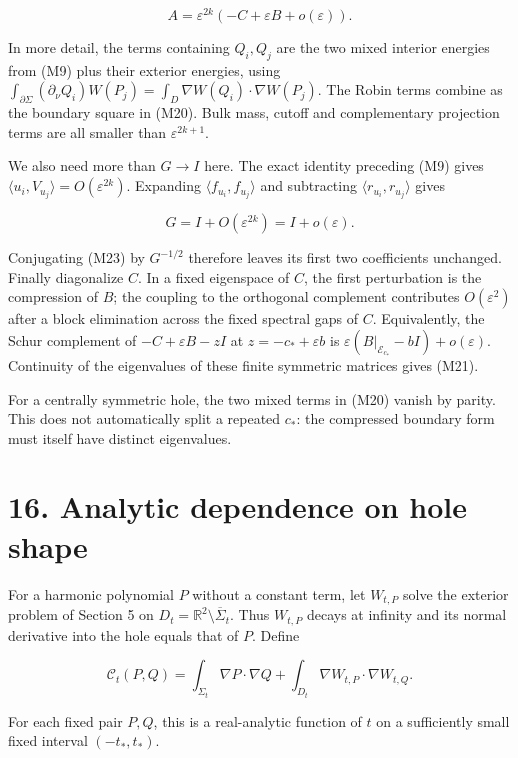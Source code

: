 \documentclass[11pt]{article}
\begin{document}
\[
 A=\varepsilon^{2k}(-C+\varepsilon B+o(\varepsilon)).
 \tag{M23}
\]

In more detail, the terms containing \(Q_i,Q_j\) are the two mixed
interior energies from (M9) plus their exterior energies, using
\(\int_{\partial\Sigma}(\partial_\nu Q_i)W(P_j)
 =\int_D\nabla W(Q_i)\cdot\nabla W(P_j)\). The Robin terms combine as
the boundary square in (M20). Bulk mass, cutoff and complementary
projection terms are all smaller than \(\varepsilon^{2k+1}\).

We also need more than \(G\to I\) here. The exact identity preceding
(M9) gives \(\langle u_i,V_{u_j}\rangle=O(\varepsilon^{2k})\). Expanding
\(\langle f_{u_i},f_{u_j}\rangle\) and subtracting
\(\langle r_{u_i},r_{u_j}\rangle\) gives

\[
 G=I+O(\varepsilon^{2k})=I+o(\varepsilon).
 \tag{M24}
\]

Conjugating (M23) by \(G^{-1/2}\) therefore leaves its first two
coefficients unchanged. Finally diagonalize \(C\). In a fixed eigenspace
of \(C\), the first perturbation is the compression of \(B\); the
coupling to the orthogonal complement contributes \(O(\varepsilon^2)\)
after a block elimination across the fixed spectral gaps of \(C\).
Equivalently, the Schur complement of \(-C+\varepsilon B-zI\) at
\(z=-c_*+\varepsilon b\) is
\(\varepsilon(B|_{\mathcal E_{c_*}}-bI)+o(\varepsilon)\). Continuity of
the eigenvalues of these finite symmetric matrices gives (M21).

For a centrally symmetric hole, the two mixed terms in (M20) vanish by
parity. This does not automatically split a repeated \(c_*\): the
compressed boundary form must itself have distinct eigenvalues.

\section{16. Analytic dependence on hole
shape}\label{analytic-dependence-on-hole-shape}

For a harmonic polynomial \(P\) without a constant term, let \(W_{t,P}\)
solve the exterior problem of Section 5 on
\(D_t=\mathbb R^2\setminus\overline\Sigma_t\). Thus \(W_{t,P}\) decays
at infinity and its normal derivative into the hole equals that of
\(P\). Define

\[
 \mathcal C_t(P,Q)=\int_{\Sigma_t}\nabla P\cdot\nabla Q
       +\int_{D_t}\nabla W_{t,P}\cdot\nabla W_{t,Q}.
 \tag{H2}
\]

For each fixed pair \(P,Q\), this is a real-analytic function of \(t\)
on a sufficiently small fixed interval \((-t_*,t_*)\).
\end{document}
